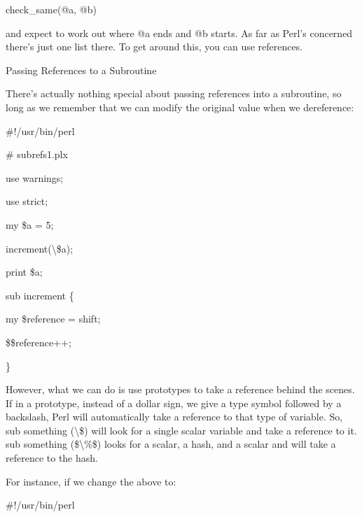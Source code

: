 \documentclass[a4paper,11pt]{book}
\begin{document}
\noindent 

\noindent check\_same(@a, @b)

\noindent 

\noindent and expect to work out where @a ends and @b starts. As far as Perl's concerned there's just one list there. To get around this, you can use references.

\noindent 

\noindent 

\noindent Passing References to a Subroutine

\noindent 

\noindent There's actually nothing special about passing references into a subroutine, so long as we remember that we can modify the original value when we dereference:

\noindent 

\noindent 

\noindent \#!/usr/bin/perl

\noindent \# subrefs1.plx

\noindent use warnings;

\noindent use strict;

\noindent 

\noindent my \$a = 5;

\noindent increment(\textbackslash \$a);

\noindent print \$a;

\noindent 

\noindent sub increment \{

\noindent my \$reference = shift;

\noindent \$\$reference++;

\noindent \}

\noindent 

\noindent However, what we can do is use prototypes to take a reference behind the scenes. If in a prototype, instead of a dollar sign, we give a type symbol followed by a backslash, Perl will automatically take a reference to that type of variable. So, sub something (\textbackslash \$) will look for a single scalar variable and take a reference to it. sub something (\$\textbackslash \%\$) looks for a scalar, a hash, and a scalar and will take a reference to the hash.

\noindent 

\noindent For instance, if we change the above to:

\noindent 

\noindent 

\noindent \#!/usr/bin/perl
\end{document}
